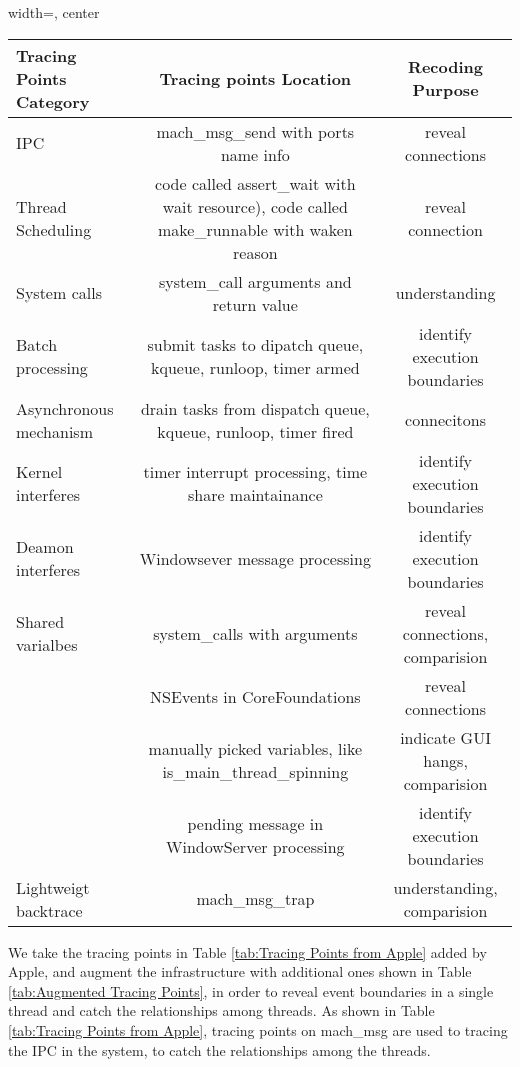 \begin{table*}[h]
\begin{adjustbox}{width=, center}
\centering
\begin{tabular}{|l|c|c|}
\hline
Tracing Points Category & Tracing points Location & Recoding Purpose\\
\hline
\hline
IPC & mach\_msg\_send with ports name info & reveal connections\\
\hline
Thread Scheduling & code called assert\_wait with wait resource), code called make\_runnable with waken reason & reveal connection\\
\hline
System calls & system\_call arguments and return value & understanding\\
\hline
Batch processing & submit tasks to dipatch queue, kqueue, runloop, timer armed & identify execution boundaries\\
\hline
Asynchronous mechanism & drain tasks from dispatch queue, kqueue, runloop, timer fired& connecitons\\
\hline
Kernel interferes & timer interrupt processing, time share maintainance & identify execution boundaries\\
\hline
Deamon interferes & Windowsever message processing & identify execution boundaries\\
\hline
Shared varialbes & system\_calls with arguments & reveal connections, comparision\\
	& NSEvents in CoreFoundations & reveal connections\\
	& manually picked variables, like is\_main\_thread\_spinning & indicate GUI hangs, comparision\\
	& pending message in WindowServer processing & identify execution boundaries\\
\hline
Lightweigt backtrace & mach\_msg\_trap & understanding, comparision\\
\hline
\end{tabular}
\end{adjustbox}
\caption{Augmented Tracing Points}
\label{tab:Augmented Tracing Points}
\end{table*}
We take the tracing points in Table \ref{tab:Tracing Points from Apple} added by Apple, and augment the infrastructure with additional ones shown in Table \ref{tab:Augmented Tracing Points}, in order to reveal event boundaries in a single thread and catch the relationships among threads.
As shown in Table \ref{tab:Tracing Points from Apple}, tracing points on mach\_msg are used to tracing the IPC in the system, to catch the relationships among the threads.
